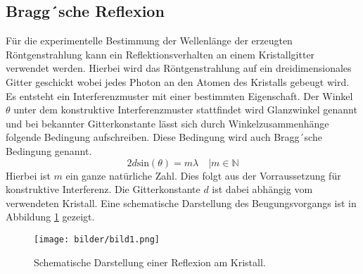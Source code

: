 \subsection{Bragg´sche Reflexion}
Für die experimentelle Bestimmung der Wellenlänge der erzeugten Röntgenstrahlung kann ein Reflektionsverhalten an einem Kristallgitter verwendet werden.
Hierbei wird das Röntgenstrahlung auf ein dreidimensionales Gitter geschickt wobei jedes Photon an den Atomen des Kristalls gebeugt wird. Es entsteht ein Interferenzmuster mit einer bestimmten Eigenschaft.
Der Winkel $\theta$ unter dem konstruktive Interferenzmuster stattfindet wird Glanzwinkel genannt und bei bekannter Gitterkonstante lässt sich durch Winkelzusammenhänge folgende Bedingung aufschreiben.
Diese Bedingung wird auch Bragg´sche Bedingung genannt.
\begin{equation}
\nonumber
2 d \text{sin}(\theta) =  m \lambda \quad | m \in \mathbb{N}
\end{equation}
Hierbei ist $m$ ein ganze natürliche Zahl. Dies folgt aus der Vorraussetzung für konstruktive Interferenz. Die Gitterkonstante $d$ ist dabei abhängig vom verwendeten Kristall.
Eine schematische Darstellung des Beugungsvorgangs ist in Abbildung \ref{fig:bild1} gezeigt.
\begin{figure}[h]
  \centering
  \texttt{[image: bilder/bild1.png]}
  \caption{Schematische Darstellung einer Reflexion am Kristall.}
  \label{fig:bild1}
\end{figure}
